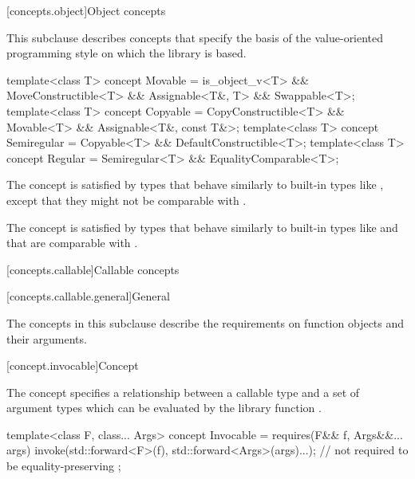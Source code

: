 [concepts.object]{Object concepts}

\pnum
This subclause describes concepts that specify the basis of the
value-oriented programming style on which the library is based.

%
%
%
%
\begin{itemdecl}
template<class T>
  concept Movable = is_object_v<T> && MoveConstructible<T> && Assignable<T&, T> && Swappable<T>;
template<class T>
  concept Copyable = CopyConstructible<T> && Movable<T> && Assignable<T&, const T&>;
template<class T>
  concept Semiregular = Copyable<T> && DefaultConstructible<T>;
template<class T>
  concept Regular = Semiregular<T> && EqualityComparable<T>;
\end{itemdecl}

\begin{itemdescr}
\pnum
\begin{note}
The  concept is satisfied by types that behave similarly
to built-in types like , except that they might not
be comparable with \tcode{==}.
\end{note}

\pnum
\begin{note}
The  concept is satisfied by types that behave similarly to
built-in types like  and that are comparable with
\tcode{==}.
\end{note}
\end{itemdescr}

[concepts.callable]{Callable concepts}

[concepts.callable.general]{General}

\pnum
The concepts in this subclause describe the requirements on function
objects and their arguments.

[concept.invocable]{Concept }

\pnum
The  concept specifies a relationship between a callable
type  and a set of argument types  which
can be evaluated by the library function .

%
\begin{itemdecl}
template<class F, class... Args>
  concept Invocable = requires(F&& f, Args&&... args) {
    invoke(std::forward<F>(f), std::forward<Args>(args)...); // not required to be equality-preserving
  };
\end{itemdecl}

